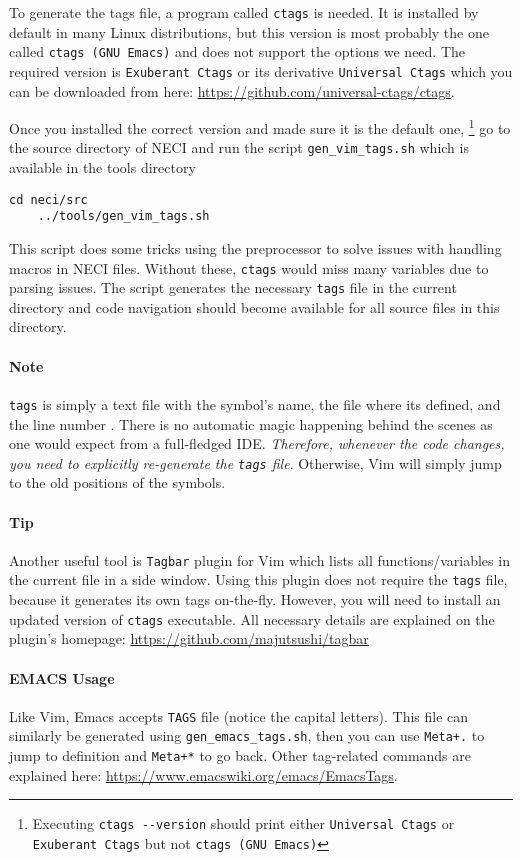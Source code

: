 \documentclass[a4paper,notitlepage,dvipsnames]{scrreprt}
\let\code\lstinline
\begin{document}
To generate the tags file, a program called \code{ctags} is needed. It is installed  by default in many Linux distributions, but this version is most probably the one called  \code {ctags (GNU Emacs)} and does not support the options we need. The required version is \code{Exuberant Ctags} or its derivative \code{Universal Ctags} which you can be downloaded from here: \url{https://github.com/universal-ctags/ctags}.

Once you installed the correct version and made sure it is the default one,  \footnote{Executing \code{ctags --version} should print either \code{Universal Ctags} or \code{Exuberant Ctags} but not \code{ctags (GNU Emacs)}} go to the source directory of NECI and run the script \code{gen_vim_tags.sh} which is available in the tools directory
\begin{lstlisting}[gobble=4]
	 cd neci/src
    ../tools/gen_vim_tags.sh
 \end{lstlisting}
 This script does some tricks using the preprocessor to solve issues with handling macros in NECI files.  Without these, \code{ctags} would miss many variables due to parsing issues.
The script generates the necessary \code{tags} file in the current directory and code navigation should become available for all source files in this directory.


\paragraph{Note} \code{tags} is simply a text file with the symbol's name,  the file where its defined, and the line number . There is no automatic magic happening behind the scenes as one would expect from a full-fledged IDE. \emph{Therefore, whenever the code changes, you need to explicitly re-generate the \code{tags} file}. Otherwise, Vim will simply jump to the old positions of the symbols.

\paragraph{Tip} Another useful tool is \code{Tagbar} plugin for Vim which lists all functions/variables in the current file in a side window. Using this plugin does not require the \code{tags} file, because it generates its own tags on-the-fly. However, you will need to install an updated version of \code{ctags} executable. All necessary details are explained on the plugin's homepage: \url{https://github.com/majutsushi/tagbar}


\paragraph{EMACS Usage}
Like Vim, Emacs accepts  \code{TAGS} file (notice the capital letters).
This file can similarly be generated using \code{gen_emacs_tags.sh}, then you can use \code{Meta+.} to jump to definition and \code{Meta+*} to go back. Other tag-related commands are explained here: \url{https://www.emacswiki.org/emacs/EmacsTags}.
\end{document}
